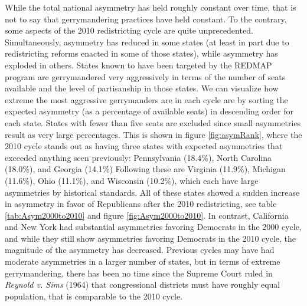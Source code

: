 \documentclass[preprint,12pt]{article}
\begin{document}
While the total national asymmetry has held roughly constant over time, that is not to say that gerrymandering practices have held constant.
To the contrary, some aspects of the 2010 redistricting cycle are quite unprecedented.
Simultaneously, asymmetry has reduced in some states (at least in part due to redistricting reforms enacted in some of those states), while asymmetry has exploded in others.
States known to have been targeted by the REDMAP program are gerrymandered very aggressively in terms of the number of seats available and the level of partisanship in those states.
We can visualize how extreme the most aggressive gerrymanders are in each cycle are by sorting the expected asymmetry (as a percentage of available seats) in descending order for each state.
States with fewer than five seats are excluded since small asymmetries result as very large percentages.
This is shown in figure \ref{fig:asymRank}, where the 2010 cycle stands out as having three states with expected asymmetries that exceeded anything seen previously: Pennsylvania (18.4\%), North Carolina (18.0\%), and Georgia (14.1\%)
Following these are Virginia (11.9\%), Michigan (11.6\%), Ohio (11.1\%), and Wisconsin (10.2\%), which each have large asymmetries by historical standards.
All of these states showed a sudden increase in asymmetry in favor of Republicans after the 2010 redistricting, see table \ref{tab:Asym2000to2010} and figure \ref{fig:Asym2000to2010}. 
In contrast, California and New York had substantial asymmetries favoring Democrats in the 2000 cycle, and while they still show asymmetries favoring Democrats in the 2010 cycle, the magnitude of the asymmetry has decreased.
Previous cycles may have had moderate asymmetries in a larger number of states, but in terms of extreme gerrymandering, there has been no time since the Supreme Court ruled in \emph{Reynold v. Sims} (1964) that congressional districts must have roughly equal population, that is comparable to the 2010 cycle.
\end{document}
